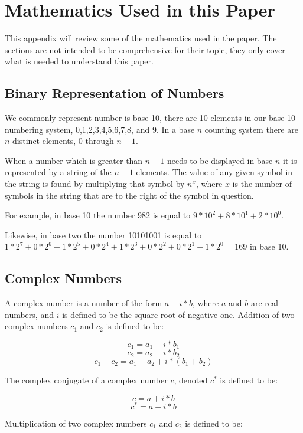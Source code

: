 \documentclass[]{article}
\begin{document}
\appendix
\section{Mathematics Used in this Paper}

This appendix will review some of the mathematics used in the paper.
The sections are not intended to be comprehensive for their topic,
they only cover what is needed to understand this paper.

\subsection{Binary Representation of Numbers}

We commonly represent number is base 10, there are 10 elements in our
base 10 numbering system, 0,1,2,3,4,5,6,7,8, and 9.  In a base $n$
counting system there are $n$ distinct elements, 0 through $n - 1$.

When a number which is greater than $n - 1$ needs to be displayed in
base $n$ it is represented by a string of the $n - 1$ elements.  The
value of any given symbol in the string is found by multiplying that
symbol by $n^{x}$, where $x$ is the number of symbols in the string
that are to the right of the symbol in question.

For example, in base 10 the number 982 is equal to $9 * 10^{2} +
8*10^{1} + 2*10^{0}$.

Likewise, in base two the number 10101001 is equal to
$1*2^{7}+0*2^{6}+1*2^{5}+0*2^{4}+1*2^{3}+0*2^{2}+0*2^{1}+1*2^{0} = 169$ in base 10.

\subsection{Complex Numbers}

A complex number is a number of the form $a + i*b$, where $a$ and $b$
are real numbers, and $i$ is defined to be the square root of negative
one.  Addition of two complex numbers $c_{1}$ and $c_{2}$ is defined
to be:

	\[c_{1} = a_{1} + i * b_{1}\] 
	\[c_{2} = a_{2} + i * b_{2}\] 
	\[c_{1} + c_{2} = a_{1} + a_{2} + i * (b_{1} + b_{2})\]

The complex conjugate of a complex number $c$, denoted $c^{*}$ is
defined to be:

	\[c = a + i * b\] 
	\[c^{*} = a - i * b\]

Multiplication of two complex numbers $c_{1}$ and $c_{2}$ is defined
to be:
\end{document}
